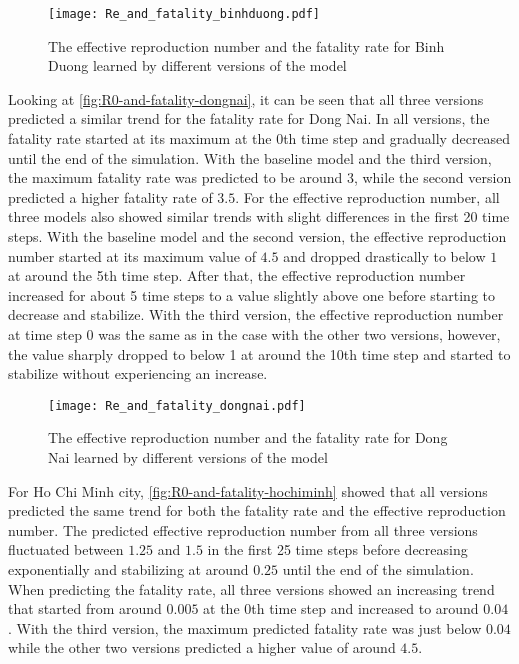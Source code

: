 \begin{figure}[!htb]
    \centering
    \texttt{[image: Re\_and\_fatality\_binhduong.pdf]}
    \caption{The effective reproduction number and the fatality rate for Binh Duong learned by different versions of the model}
    \label{fig:R0-and-fatality-binhduong}
\end{figure}

Looking at \autoref{fig:R0-and-fatality-dongnai}, it can be seen that all three versions predicted a similar trend for the fatality rate for Dong Nai.
In all versions, the fatality rate started at its maximum at the 0th time step and gradually decreased until the end of the simulation.
With the baseline model and the third version, the maximum fatality rate was predicted to be around $3$, while the second version predicted a higher fatality rate of $3.5$.
For the effective reproduction number, all three models also showed similar trends with slight differences in the first 20 time steps.
With the baseline model and the second version, the effective reproduction number started at its maximum value of $4.5$ and dropped drastically to below $1$ at around the 5th time step.
After that, the effective reproduction number increased for about 5 time steps to a value slightly above one before starting to decrease and stabilize.
With the third version, the effective reproduction number at time step 0 was the same as in the case with the other two versions, however, the value sharply dropped to below 1 at around the 10th time step and started to stabilize without experiencing an increase.

\begin{figure}[!htb]
    \centering
    \texttt{[image: Re\_and\_fatality\_dongnai.pdf]}
    \caption{The effective reproduction number and the fatality rate for Dong Nai learned by different versions of the model}
    \label{fig:R0-and-fatality-dongnai}
\end{figure}

For Ho Chi Minh city, \autoref{fig:R0-and-fatality-hochiminh} showed that all versions predicted the same trend for both the fatality rate and the effective reproduction number.
The predicted effective reproduction number from all three versions fluctuated between $1.25$ and $1.5$ in the first 25 time steps before decreasing exponentially and stabilizing at around $0.25$ until the end of the simulation.
When predicting the fatality rate, all three versions showed an increasing trend that started from around $0.005$ at the 0th time step and increased to around $0.04$.
With the third version, the maximum predicted fatality rate was just below $0.04$ while the other two versions predicted a higher value of around $4.5$.

